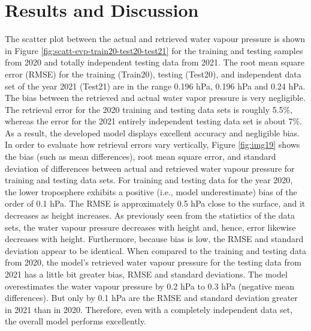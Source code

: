 \documentclass[a4paper,12pt,twoside]{article}
\begin{document}
\section{Results and Discussion}

\noindent  The scatter plot between the actual and retrieved water vapour pressure is shown in Figure \ref{fig:scatt-evp-train20-test20-test21} for the training and testing samples from 2020 and totally independent testing data from 2021. The root mean square error (RMSE) for the training (Train20), testing (Test20), and independent data set of the year 2021 (Test21) are in the range 0.196 hPa, 0.196 hPa and 0.24 hPa. The bias between the retrieved and actual water vapor pressure is very negligible. The retrieval error for the 2020 training and testing data sets is roughly 5.5\%, whereas the error for the 2021 entirely independent testing data set is about 7\%. As a result, the developed model displays excellent accuracy and negligible bias. In order to evaluate how retrieval errors vary vertically, Figure \ref{fig:img19} shows the bias (such as mean differences), root mean square error, and standard deviation of differences between actual and retrieved water vapour pressure for training and testing data sets. For training and testing data for the year 2020, the lower troposphere exhibits a positive (i.e., model underestimate) bias of the order of 0.1 hPa. The RMSE is approximately 0.5 hPa close to the surface, and it decreases as height increases. As previously seen from the statistics of the data sets, the water vapour pressure decreases with height and, hence, error likewise decreases with height. Furthermore, because bias is low, the RMSE and standard deviation appear to be identical. When compared to the training and testing data from 2020, the model's retrieved water vapour pressure for the testing data from 2021 has a little bit greater bias, RMSE and standard deviations. The model overestimates the water vapour pressure by 0.2 hPa to 0.3 hPa (negative mean differences). But only by 0.1 hPa are the RMSE and standard deviation greater in 2021 than in 2020. Therefore, even with a completely independent data set, the overall model performs excellently. \\
\end{document}
